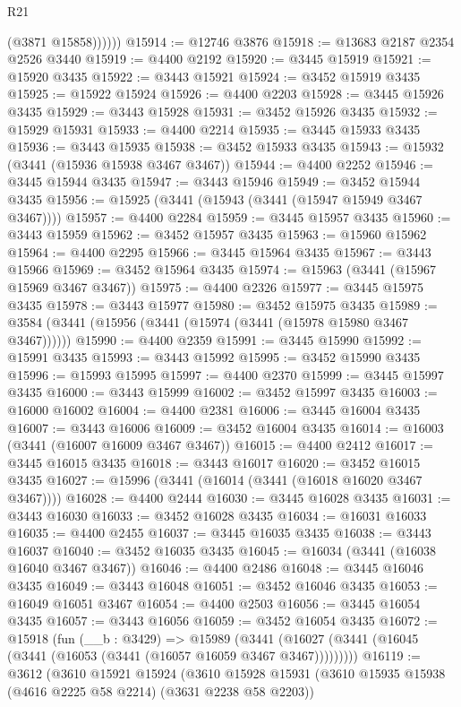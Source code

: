 \begin{lexlean}{R21}
\begin{coremodule}
              (@3871 @15858))))))
@15914 := @12746 @3876
@15918 := @13683 @2187 @2354 @2526 @3440
@15919 := @4400 @2192
@15920 := @3445 @15919
@15921 := @15920 @3435
@15922 := @3443 @15921
@15924 := @3452 @15919 @3435
@15925 := @15922 @15924
@15926 := @4400 @2203
@15928 := @3445 @15926 @3435
@15929 := @3443 @15928
@15931 := @3452 @15926 @3435
@15932 := @15929 @15931
@15933 := @4400 @2214
@15935 := @3445 @15933 @3435
@15936 := @3443 @15935
@15938 := @3452 @15933 @3435
@15943 := @15932 (@3441 (@15936 @15938 @3467 @3467))
@15944 := @4400 @2252
@15946 := @3445 @15944 @3435
@15947 := @3443 @15946
@15949 := @3452 @15944 @3435
@15956 := @15925 (@3441 (@15943 (@3441 (@15947 @15949 @3467 @3467))))
@15957 := @4400 @2284
@15959 := @3445 @15957 @3435
@15960 := @3443 @15959
@15962 := @3452 @15957 @3435
@15963 := @15960 @15962
@15964 := @4400 @2295
@15966 := @3445 @15964 @3435
@15967 := @3443 @15966
@15969 := @3452 @15964 @3435
@15974 := @15963 (@3441 (@15967 @15969 @3467 @3467))
@15975 := @4400 @2326
@15977 := @3445 @15975 @3435
@15978 := @3443 @15977
@15980 := @3452 @15975 @3435
@15989 := @3584 (@3441 (@15956 (@3441 (@15974 (@3441 (@15978 @15980 @3467 @3467))))))
@15990 := @4400 @2359
@15991 := @3445 @15990
@15992 := @15991 @3435
@15993 := @3443 @15992
@15995 := @3452 @15990 @3435
@15996 := @15993 @15995
@15997 := @4400 @2370
@15999 := @3445 @15997 @3435
@16000 := @3443 @15999
@16002 := @3452 @15997 @3435
@16003 := @16000 @16002
@16004 := @4400 @2381
@16006 := @3445 @16004 @3435
@16007 := @3443 @16006
@16009 := @3452 @16004 @3435
@16014 := @16003 (@3441 (@16007 @16009 @3467 @3467))
@16015 := @4400 @2412
@16017 := @3445 @16015 @3435
@16018 := @3443 @16017
@16020 := @3452 @16015 @3435
@16027 := @15996 (@3441 (@16014 (@3441 (@16018 @16020 @3467 @3467))))
@16028 := @4400 @2444
@16030 := @3445 @16028 @3435
@16031 := @3443 @16030
@16033 := @3452 @16028 @3435
@16034 := @16031 @16033
@16035 := @4400 @2455
@16037 := @3445 @16035 @3435
@16038 := @3443 @16037
@16040 := @3452 @16035 @3435
@16045 := @16034 (@3441 (@16038 @16040 @3467 @3467))
@16046 := @4400 @2486
@16048 := @3445 @16046 @3435
@16049 := @3443 @16048
@16051 := @3452 @16046 @3435
@16053 := @16049 @16051 @3467
@16054 := @4400 @2503
@16056 := @3445 @16054 @3435
@16057 := @3443 @16056
@16059 := @3452 @16054 @3435
@16072 := @15918
    (fun (__b : @3429) =>
    @15989 (@3441 (@16027 (@3441 (@16045 (@3441 (@16053 (@3441 (@16057 @16059 @3467 @3467)))))))))
@16119 := @3612
    (@3610
      @15921
      @15924
      (@3610
        @15928
        @15931
        (@3610 @15935 @15938 (@4616 @2225 @58 @2214) (@3631 @2238 @58 @2203))

\end{coremodule}
\end{lexlean}
